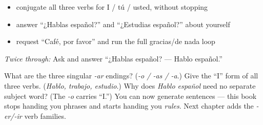 \begin{itemize}
\raggedright
  \item conjugate all three verbs for I / tú / usted, without stopping
  \item answer “¿Hablas español?” and “¿Estudias español?” about yourself
  \item request “Café, por favor” and run the full gracias/de nada loop
\end{itemize}

\emph{Twice through:} Ask and answer “¿Hablas español? — Hablo español.”

\begin{tcolorbox}[breakable,colback=teal!4,colframe=teal!35!black,title={Before you move on}]
What are the three singular \emph{-ar} endings? (\emph{-o / -as / -a}.) Give the “I” form of all three verbs. (\emph{Hablo, trabajo, estudio}.) Why does \emph{Hablo español} need no separate subject word? (The \emph{-o} carries “I.”) You can now generate sentences — this book stops handing you phrases and starts handing you \emph{rules}. Next chapter adds the \emph{-er/-ir} verb families.
\end{tcolorbox}

